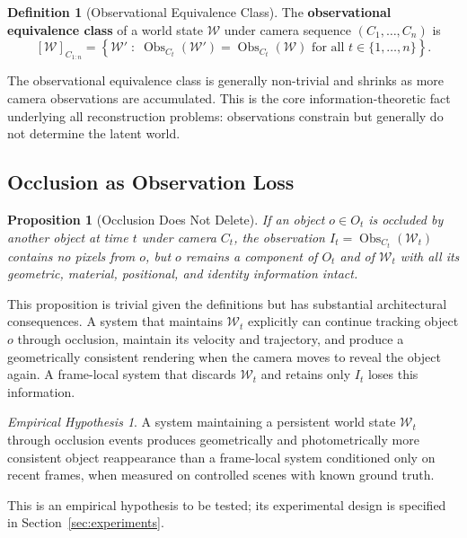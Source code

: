 \documentclass[12pt,a4paper]{article}
\theoremstyle{plain}
\newtheorem{proposition}[theorem]{Proposition}
\theoremstyle{definition}
\newtheorem{definition}[theorem]{Definition}
\theoremstyle{remark}
\newtheorem{hypothesis}[theorem]{Empirical Hypothesis}
\DeclareMathOperator{\Obs}{Obs}
\begin{document}
\begin{definition}[Observational Equivalence Class]
The \textbf{observational equivalence class} of a world state $\mathcal{W}$ under camera sequence $(C_1, \ldots, C_n)$ is
\[
[\mathcal{W}]_{C_{1:n}} = \left\{ \mathcal{W}' \;:\; \Obs_{C_t}(\mathcal{W}') = \Obs_{C_t}(\mathcal{W}) \text{ for all } t \in \{1, \ldots, n\} \right\}.
\]
\end{definition}

The observational equivalence class is generally non-trivial and shrinks as more camera observations are accumulated. This is the core information-theoretic fact underlying all reconstruction problems: observations constrain but generally do not determine the latent world.

\subsection{Occlusion as Observation Loss}

\begin{proposition}[Occlusion Does Not Delete]
If an object $o \in O_t$ is occluded by another object at time $t$ under camera $C_t$, the observation $I_t = \Obs_{C_t}(\mathcal{W}_t)$ contains no pixels from $o$, but $o$ remains a component of $O_t$ and of $\mathcal{W}_t$ with all its geometric, material, positional, and identity information intact.
\end{proposition}

This proposition is trivial given the definitions but has substantial architectural consequences. A system that maintains $\mathcal{W}_t$ explicitly can continue tracking object $o$ through occlusion, maintain its velocity and trajectory, and produce a geometrically consistent rendering when the camera moves to reveal the object again. A frame-local system that discards $\mathcal{W}_t$ and retains only $I_t$ loses this information.

\begin{hypothesis}
\label{hyp:occlusion}
A system maintaining a persistent world state $\mathcal{W}_t$ through occlusion events produces geometrically and photometrically more consistent object reappearance than a frame-local system conditioned only on recent frames, when measured on controlled scenes with known ground truth.
\end{hypothesis}

This is an empirical hypothesis to be tested; its experimental design is specified in Section~\ref{sec:experiments}.
\end{document}
